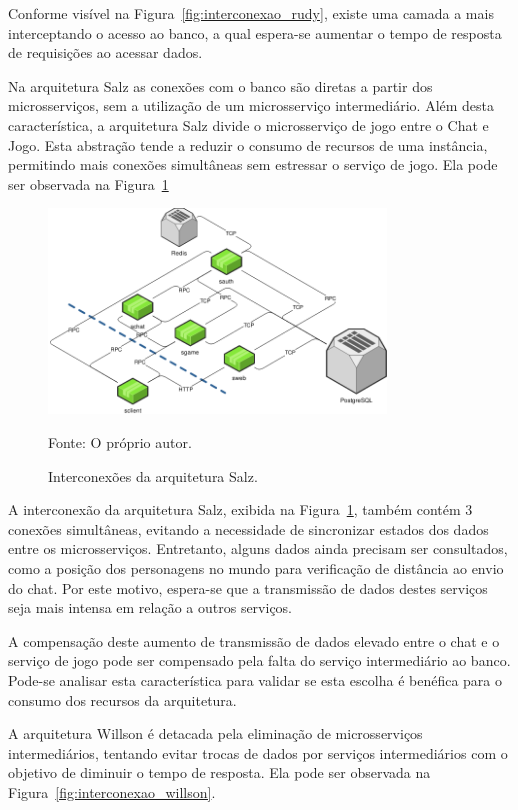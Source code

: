 Conforme visível na Figura~\ref{fig:interconexao_rudy}, existe uma camada a mais interceptando o acesso ao banco, a qual espera-se aumentar o tempo de resposta de requisições ao acessar dados.

Na arquitetura Salz as conexões com o banco são diretas a partir dos microsserviços, sem a utilização de um microsserviço intermediário.
%
Além desta característica, a arquitetura Salz divide o microsserviço de jogo entre o Chat e Jogo. Esta abstração tende a reduzir o consumo de recursos de uma instância, permitindo mais conexões simultâneas sem estressar o serviço de jogo.
%
Ela pode ser observada na Figura~\ref{fig:interconexao_salz}

\begin{figure}[htb!]
  \caption{Interconexões da arquitetura Salz.}
  \label{fig:interconexao_salz}
  \includegraphics[width=0.8\textwidth]{figuras/interconexoes/salz.png}
  \centering

  Fonte: O próprio autor.
\end{figure}

A interconexão da arquitetura Salz, exibida na Figura~\ref{fig:interconexao_salz}, também contém 3 conexões simultâneas, evitando a necessidade de sincronizar estados dos dados entre os microsserviços.
%
Entretanto, alguns dados ainda precisam ser consultados, como a posição dos personagens no mundo para verificação de distância ao envio do chat.
%
Por este motivo, espera-se que a transmissão de dados destes serviços seja mais intensa em relação a outros serviços.

A compensação deste aumento de transmissão de dados elevado entre o chat e o serviço de jogo pode ser compensado pela falta do serviço intermediário ao banco.
%
Pode-se analisar esta característica para validar se esta escolha é benéfica para o consumo dos recursos da arquitetura.

A arquitetura Willson é detacada pela eliminação de microsserviços intermediários, tentando evitar trocas de dados por serviços intermediários com o objetivo de diminuir o tempo de resposta.
%
Ela pode ser observada na Figura~\ref{fig:interconexao_willson}.

